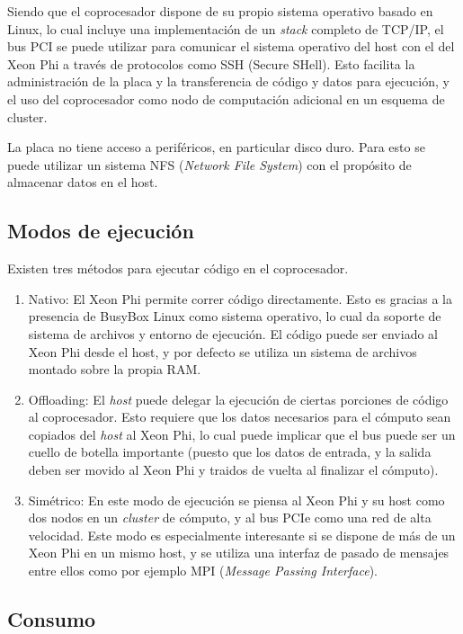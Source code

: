 Siendo que el coprocesador dispone de su propio sistema operativo basado en Linux, lo cual incluye una implementaci\'on
de un \textit{stack} completo de TCP/IP, el bus PCI se puede utilizar para comunicar el sistema operativo del host con
el del Xeon Phi a trav\'es de protocolos como SSH (Secure SHell). Esto facilita la administraci\'on de la placa y la
transferencia de c\'odigo y datos para ejecuci\'on, y el uso del coprocesador como nodo de computaci\'on adicional en un
esquema de cluster.

La placa no tiene acceso a perif\'ericos, en particular disco duro. Para esto se puede utilizar un sistema NFS (\textit{Network
File System}) con el prop\'osito de almacenar datos en el host.

\subsection{Modos de ejecuci\'on}

Existen tres m\'etodos para ejecutar c\'odigo en el coprocesador.

\begin{enumerate}
    \item Nativo: El Xeon Phi permite correr c\'odigo directamente. Esto es gracias a la presencia de BusyBox Linux como sistema operativo,
    lo cual da soporte de sistema de archivos y entorno de ejecuci\'on. El c\'odigo puede ser enviado al Xeon Phi desde el host, y por defecto se utiliza un sistema
    de archivos montado sobre la propia RAM. 
    \item Offloading: El \textit{host} puede delegar la ejecuci\'on de ciertas porciones de c\'odigo al coprocesador. 
    Esto requiere que los datos necesarios para el c\'omputo sean copiados del \textit{host} al Xeon Phi, lo cual puede implicar que el bus puede ser un cuello de botella 
    importante (puesto que los datos de entrada, y la salida deben ser movido al Xeon Phi y traidos de vuelta al finalizar el c\'omputo).
    \item Simétrico: En este modo de ejecuci\'on se piensa al Xeon Phi y su host como dos nodos en un \textit{cluster} de c\'omputo, y al bus PCIe como una red de alta velocidad.
    Este modo es especialmente interesante si se dispone de m\'as de un Xeon Phi en un mismo host, 
    y se utiliza una interfaz de pasado de mensajes entre ellos como por ejemplo MPI (\textit{Message Passing Interface}).
\end{enumerate}

\subsection{Consumo}

